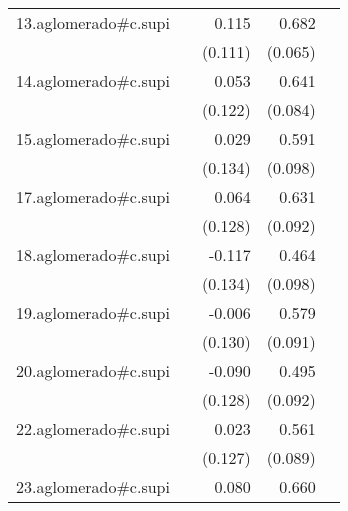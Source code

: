 {\begin{longtable}{l*{4}{D{.}{.}{-1}}}
\addlinespace
13.aglomerado#c.supi&                     &       0.115         &       0.682\sym{***}&                     \\
            &                     &     (0.111)         &     (0.065)         &                     \\
\addlinespace
14.aglomerado#c.supi&                     &       0.053         &       0.641\sym{***}&                     \\
            &                     &     (0.122)         &     (0.084)         &                     \\
\addlinespace
15.aglomerado#c.supi&                     &       0.029         &       0.591\sym{***}&                     \\
            &                     &     (0.134)         &     (0.098)         &                     \\
\addlinespace
17.aglomerado#c.supi&                     &       0.064         &       0.631\sym{***}&                     \\
            &                     &     (0.128)         &     (0.092)         &                     \\
\addlinespace
18.aglomerado#c.supi&                     &      -0.117         &       0.464\sym{***}&                     \\
            &                     &     (0.134)         &     (0.098)         &                     \\
\addlinespace
19.aglomerado#c.supi&                     &      -0.006         &       0.579\sym{***}&                     \\
            &                     &     (0.130)         &     (0.091)         &                     \\
\addlinespace
20.aglomerado#c.supi&                     &      -0.090         &       0.495\sym{***}&                     \\
            &                     &     (0.128)         &     (0.092)         &                     \\
\addlinespace
22.aglomerado#c.supi&                     &       0.023         &       0.561\sym{***}&                     \\
            &                     &     (0.127)         &     (0.089)         &                     \\
\addlinespace
23.aglomerado#c.supi&                     &       0.080         &       0.660\sym{***}&                     \\

\end{longtable}}
